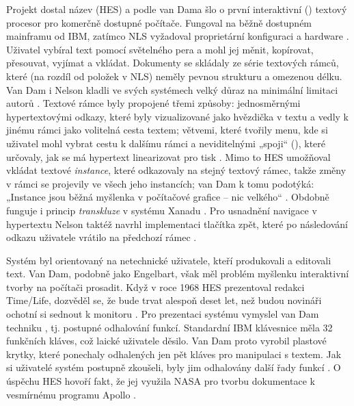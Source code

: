 Projekt dostal název  (HES) a podle van Dama šlo o první interaktivní () textový procesor pro komerčně dostupné počítače. Fungoval na běžně dostupném mainframu od IBM, zatímco NLS vyžadoval proprietární konfiguraci a hardware \autocite[104--105]{Barnet2014}. Uživatel vybíral text pomocí světelného pera a mohl jej měnit, kopírovat, přesouvat, vyjímat a vkládat. Dokumenty se skládaly ze série textových rámců, které (na rozdíl od položek v NLS) neměly pevnou strukturu a omezenou délku. Van Dam i Nelson kladli ve svých systémech velký důraz na minimální limitaci autorů \autocite[103]{Barnet2014}. Textové rámce byly propojené třemi způsoby: jednosměrnými hypertextovými odkazy, které byly vizualizované jako hvězdička v textu a vedly k jinému rámci jako volitelná cesta textem; větvemi, které tvořily menu, kde si uživatel mohl vybrat cestu k dalšímu rámci \autocite[104]{Barnet2014} a neviditelnými „spoji“ (), které určovaly, jak se má hypertext linearizovat pro tisk \autocite[889]{vanDam1988}. Mimo to HES umožňoval vkládat textové \textit{instance}, které odkazovaly na stejný textový rámec, takže změny v rámci se projevily ve všech jeho instancích; van Dam k tomu podotýká: „Instance jsou běžná myšlenka v počítačové grafice -- nic velkého“ \autocite[889]{vanDam1988}. Obdobně funguje i princip \textit{transkluze} v systému Xanadu \autocite[18]{Muller-Prove2002}. Pro usnadnění navigace v hypertextu Nelson taktéž navrhl implementaci tlačítka zpět, které po následování odkazu uživatele vrátilo na předchozí rámec \autocite[104]{Barnet2014}.

Systém byl orientovaný na netechnické uživatele, kteří produkovali a editovali text. Van Dam, podobně jako Engelbart, však měl problém myšlenku interaktivní tvorby na počítači prosadit. Když v roce 1968 HES prezentoval redakci Time/Life, dozvěděl se, že bude trvat alespoň deset let, než budou novináři ochotní si sednout k monitoru \autocite[890]{vanDam1988}. Pro prezentaci systému vymyslel van Dam techniku , tj. postupné odhalování funkcí. Standardní IBM klávesnice měla 32 funkčních kláves, což laické uživatele děsilo. Van Dam proto vyrobil plastové krytky, které ponechaly odhalených jen pět kláves pro manipulaci s textem. Jak si uživatelé systém postupně zkoušeli, byly jim odhalovány další řady funkcí \autocite[890]{vanDam1988}. O úspěchu HES hovoří fakt, že jej využila NASA pro tvorbu dokumentace k vesmírnému programu Apollo \autocites[889]{vanDam1988}[106]{Barnet2014}.

